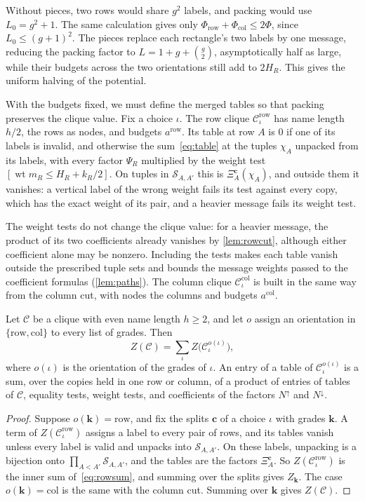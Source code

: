 \documentclass[11pt]{article}
\theoremstyle{definition}
\theoremstyle{definition}
\theoremstyle{remark}
\newcommand{\row}{\mathrm{row}}
\newcommand{\col}{\mathrm{col}}
\newcommand{\wt}{\operatorname{wt}}
\newcommand{\Nup}{N^{\uparrow}}
\newcommand{\Ndown}{N^{\downarrow}}
\begin{document}
Without pieces, two rows would share $g^2$ labels, and packing would use $L_0=g^2+1$. The same calculation gives only $\Phi_\row+\Phi_\col\le2\Phi$, since $L_0\le(g+1)^2$. The pieces replace each rectangle's two labels by one message, reducing the packing factor to $L=1+g+\binom g2$, asymptotically half as large, while their budgets across the two orientations still add to $2H_R$. This gives the uniform halving of the potential.

With the budgets fixed, we must define the merged tables so that packing preserves the clique value. Fix a choice $\iota$. The row clique $\mathcal C^\row_\iota$ has name length $h/2$, the rows as nodes, and budgets $a^\row$. Its table at row $A$ is $0$ if one of its labels is invalid, and otherwise the sum~\eqref{eq:table} at the tuples $\chi_A$ unpacked from its labels, with every factor $\Psi_R$ multiplied by the weight test $[\wt m_R\le H_R+k_R/2]$. On tuples in $\mathcal S_{A,A'}$ this is $\Xi^{\mathbf c}_A(\chi_A)$, and outside them it vanishes: a vertical label of the wrong weight fails its test against every copy, which has the exact weight of its pair, and a heavier message fails its weight test.

The weight tests do not change the clique value: for a heavier message, the product of its two coefficients already vanishes by \cref{lem:rowcut}, although either coefficient alone may be nonzero. Including the tests makes each table vanish outside the prescribed tuple sets and bounds the message weights passed to the coefficient formulas (\cref{lem:paths}). The column clique $\mathcal C^\col_\iota$ is built in the same way from the column cut, with nodes the columns and budgets $a^\col$.

\begin{lemma}\label{lem:merge}
Let $\mathcal C$ be a clique with even name length $h\ge2$, and let $o$ assign an orientation in $\{\row,\col\}$ to every list of grades. Then
\[
Z(\mathcal C)=\sum_\iota Z\bigl(\mathcal C^{o(\iota)}_\iota\bigr),
\]
where $o(\iota)$ is the orientation of the grades of $\iota$. An entry of a table of $\mathcal C^{o(\iota)}_\iota$ is a sum, over the copies held in one row or column, of a product of entries of tables of $\mathcal C$, equality tests, weight tests, and coefficients of the factors $\Nup$ and $\Ndown$.
\end{lemma}

\begin{proof}
Suppose $o(\mathbf k)=\row$, and fix the splits $\mathbf c$ of a choice $\iota$ with grades $\mathbf k$. A term of $Z(\mathcal C^\row_\iota)$ assigns a label to every pair of rows, and its tables vanish unless every label is valid and unpacks into $\mathcal S_{A,A'}$. On these labels, unpacking is a bijection onto $\prod_{A<A'}\mathcal S_{A,A'}$, and the tables are the factors $\Xi^{\mathbf c}_A$. So $Z(\mathcal C^\row_\iota)$ is the inner sum of~\eqref{eq:rowsum}, and summing over the splits gives $Z_{\mathbf k}$. The case $o(\mathbf k)=\col$ is the same with the column cut. Summing over $\mathbf k$ gives $Z(\mathcal C)$.
\end{proof}
\end{document}
